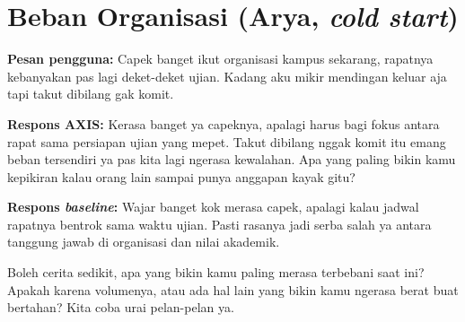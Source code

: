 \section{Beban Organisasi (Arya, \textit{cold start})}

\textbf{Pesan pengguna:} Capek banget ikut organisasi kampus sekarang, rapatnya kebanyakan pas lagi deket-deket ujian. Kadang aku mikir mendingan keluar aja tapi takut dibilang gak komit.

\textbf{Respons AXIS:} Kerasa banget ya capeknya, apalagi harus bagi fokus antara rapat sama persiapan ujian yang mepet. Takut dibilang nggak komit itu emang beban tersendiri ya pas kita lagi ngerasa kewalahan. Apa yang paling bikin kamu kepikiran kalau orang lain sampai punya anggapan kayak gitu?

\textbf{Respons \textit{baseline}:} Wajar banget kok merasa capek, apalagi kalau jadwal rapatnya bentrok sama waktu ujian. Pasti rasanya jadi serba salah ya antara tanggung jawab di organisasi dan nilai akademik.

Boleh cerita sedikit, apa yang bikin kamu paling merasa terbebani saat ini? Apakah karena volumenya, atau ada hal lain yang bikin kamu ngerasa berat buat bertahan? Kita coba urai pelan-pelan ya.

